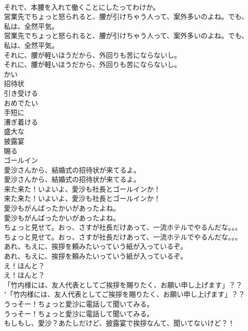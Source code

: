 \documentclass[8pt]{extreport}
\begin{document}
\begin{CJK}{UTF8}{min}
\\	それで、本腰を入れて働くことにしたってわけか。 
\\	営業先でちょっと怒られると、腰が引けちゃう人って、案外多いのよね。でも、私は、全然平気。	
\\	営業先でちょっと怒られると、腰が引けちゃう人って、案外多いのよね。でも、私は、全然平気。 
\\	それに、腰が軽いほうだから、外回りも苦にならないし。	
\\	それに、腰が軽いほうだから、外回りも苦にならないし。 
\\	かい
\\	招待状
\\	引き受ける
\\	おめでたい
\\	手短に
\\	漕ぎ着ける
\\	盛大な
\\	披露宴
\\	賜る
\\	ゴールイン
\\	愛沙さんから、結婚式の招待状が来てるよ。	
\\	愛沙さんから、結婚式の招待状が来てるよ。 
\\	来た来た！いよいよ、愛沙も社長とゴールインか！	
\\	来た来た！いよいよ、愛沙も社長とゴールインか！ 
\\	愛沙もがんばったかいがあったよね。	
\\	愛沙もがんばったかいがあったよね。 
\\	ちょっと見せて。おっ、さすが社長だけあって、一流ホテルでやるんだな。。。	
\\	ちょっと見せて。おっ、さすが社長だけあって、一流ホテルでやるんだな。。。 
\\	あれ、もえに、挨拶を頼みたいっていう紙が入っているぞ。	
\\	あれ、もえに、挨拶を頼みたいっていう紙が入っているぞ。 
\\	え！ほんと？	
\\	え！ほんと？　 
\\	「竹内様には、友人代表としてご挨拶を賜りたく、お願い申し上げます」？？	
\\	"「竹内様には、友人代表としてご挨拶を賜りたく、お願い申し上げます」？？ 
\\	うっそー！ちょっと愛沙に電話して聞いてみる。	
\\	うっそー！ちょっと愛沙に電話して聞いてみる。 
\\	もしもし、愛沙？あたしだけど、披露宴で挨拶なんて、聞いてないけど？！	

\end{CJK}
\end{document}
